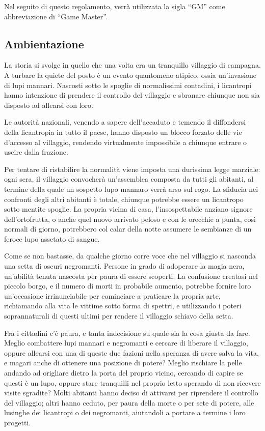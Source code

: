 \documentclass[a4paper,10pt]{article}
\begin{document}
Nel seguito di questo regolamento, verrà utilizzata la sigla ``GM'' come abbreviazione di ``Game Master''.

\subsection{Ambientazione}

La storia si svolge in quello che una volta era un tranquillo villaggio di campagna. A turbare la quiete del posto è un evento quantomeno atipico, ossia un'invasione di lupi mannari. Nascosti sotto le spoglie di normalissimi contadini, i licantropi hanno intenzione di prendere il controllo del villaggio e sbranare chiunque non sia disposto ad allearsi con loro.

Le autorità nazionali, venendo a sapere dell'accaduto e temendo il diffondersi della licantropia in tutto il paese, hanno disposto un blocco forzato delle vie d'accesso al villaggio, rendendo virtualmente impossibile a chiunque entrare o uscire dalla frazione.

Per tentare di ristabilire la normalità viene imposta una durissima legge marziale: ogni sera, il villaggio convocherà un'assemblea composta da tutti gli abitanti, al termine della quale un sospetto lupo mannaro verrà arso sul rogo. La sfiducia nei confronti degli altri abitanti è totale, chiunque potrebbe essere un licantropo sotto mentite spoglie. La propria vicina di casa, l'insospettabile anziano signore dell'ortofrutta, o anche quel nuovo arrivato peloso e con le orecchie a punta, così normali di giorno, potrebbero col calar della notte assumere le sembianze di un feroce lupo assetato di sangue.

Come se non bastasse, da qualche giorno corre voce che nel villaggio si nasconda una setta di oscuri negromanti. Persone in grado di adoperare la magia nera, un'abilità tenuta nascosta per paura di essere scoperti. La confusione creatasi nel piccolo borgo, e il numero di morti in probabile aumento, potrebbe fornire loro un'occasione irrinunciabile per cominciare a praticare la propria arte, richiamando alla vita le vittime sotto forma di spettri, e utilizzando i poteri soprannaturali di questi ultimi per rendere il villaggio schiavo della setta.

Fra i cittadini c'è paura, e tanta indecisione su quale sia la cosa giusta da fare. Meglio combattere lupi mannari e negromanti e cercare di liberare il villaggio, oppure allearsi con una di queste due fazioni nella speranza di avere salva la vita, e magari anche di ottenere una posizione di potere? Meglio rischiare la pelle andando ad origliare dietro la porta del proprio vicino, cercando di capire se questi è un lupo, oppure stare tranquilli nel proprio letto sperando di non ricevere visite sgradite? Molti abitanti hanno deciso di attivarsi per riprendere il controllo del villaggio; altri hanno ceduto, per paura della morte o per sete di potere, alle lusinghe dei licantropi o dei negromanti, aiutandoli a portare a termine i loro progetti.
\end{document}
